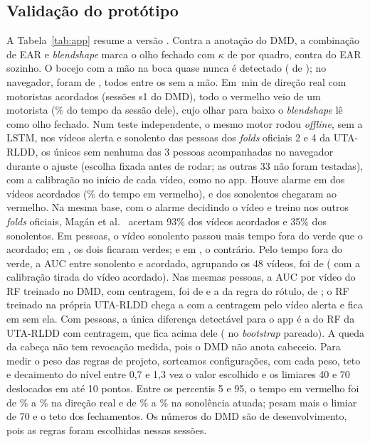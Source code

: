 \documentclass[conference]{IEEEtran}
\begin{document}
\subsection{Validação do protótipo}
\label{sec:valapp}
A Tabela~\ref{tab:app} resume a versão \AppVersao. Contra a anotação do DMD, a combinação de EAR e \emph{blendshape} marca o olho fechado com $\kappa$ de \AppKappaOffline{} por quadro, contra \AppKappaEARSozinho{} do EAR sozinho. O bocejo com a mão na boca quase nunca é detectado (\AppBocejoAcertosComMao{} de \AppBocejoAnotadosComMao); no navegador, foram \AppBocejosNavegadorAcertos{} de \AppBocejosNavegadorAnotados{}, todos entre os \AppBocejosNavegadorAnotadosSemMao{} sem a mão. Em \AppDMDMinutosDirecaoReal\,min de direção real com motoristas acordados (sessões s1 do DMD), todo o vermelho veio de um motorista (\AppGACincoVermelho\% do tempo da sessão dele), cujo olhar para baixo o \emph{blendshape} lê como olho fechado. Num teste independente, o mesmo motor rodou \emph{offline}, sem a LSTM, nos vídeos alerta e sonolento das \AppUTASujeitos{} pessoas dos \emph{folds} oficiais 2 e 4 da UTA-RLDD, os únicos sem nenhuma das 3 pessoas acompanhadas no navegador durante o ajuste (escolha fixada antes de rodar; as outras 33 não foram testadas), com a calibração no início de cada vídeo, como no app. Houve alarme em \AppUTAAcordadosAlarme{} dos \AppUTASujeitos{} vídeos acordados (\AppUTAAcordadosPctVermelho\% do tempo em vermelho), e \AppUTASonolentosVermelho{} dos \AppUTASujeitos{} sonolentos chegaram ao vermelho. Na mesma base, com o alarme decidindo o vídeo e treino nos outros \emph{folds} oficiais, Magán et al.~\cite{magan2022} acertam 93\% dos vídeos acordados e 35\% dos sonolentos. Em \AppUTAParesMais{} pessoas, o vídeo sonolento passou mais tempo fora do verde que o acordado; em \AppUTAParesEmpate, os dois ficaram verdes; e em \AppUTAParesMenos, o contrário. Pelo tempo fora do verde, a AUC entre sonolento e acordado, agrupando os 48 vídeos, foi de \AppUTAAUCForaVerdeComIC{} (\AppUTAAUCForaVerdeCalAcordado{} com a calibração tirada do vídeo acordado). Nas mesmas pessoas, a AUC por vídeo do RF treinado no DMD, com centragem, foi de \AppCompCRF{} e a da regra do rótulo, de \AppCompRegra; o RF treinado na própria UTA-RLDD chega a \AppCompBRF{} com a centragem pelo vídeo alerta e fica em \AppCompBRFSemNorm{} sem ela. Com \AppUTASujeitos{} pessoas, a única diferença detectável para o app é a do RF da UTA-RLDD com centragem, que fica acima dele (\AppCompBRFDifComIC{} no \emph{bootstrap} pareado). A queda da cabeça não tem revocação medida, pois o DMD não anota cabeceio. Para medir o peso das regras de projeto, sorteamos \AppPesosTotal{} configurações, com cada peso, teto e decaimento do nível entre 0,7 e 1,3 vez o valor escolhido e os limiares 40 e 70 deslocados em até 10 pontos. Entre os percentis 5 e 95, o tempo em vermelho foi de \AppPesosSUmVermelhoPcinco\% a \AppPesosSUmVermelhoPnoventaecinco\% na direção real e de \AppPesosSCincoVermelhoPcinco\% a \AppPesosSCincoVermelhoPnoventaecinco\% na sonolência atuada; pesam mais o limiar de 70 e o teto dos fechamentos. Os números do DMD são de desenvolvimento, pois as regras foram escolhidas nessas sessões.
\end{document}
